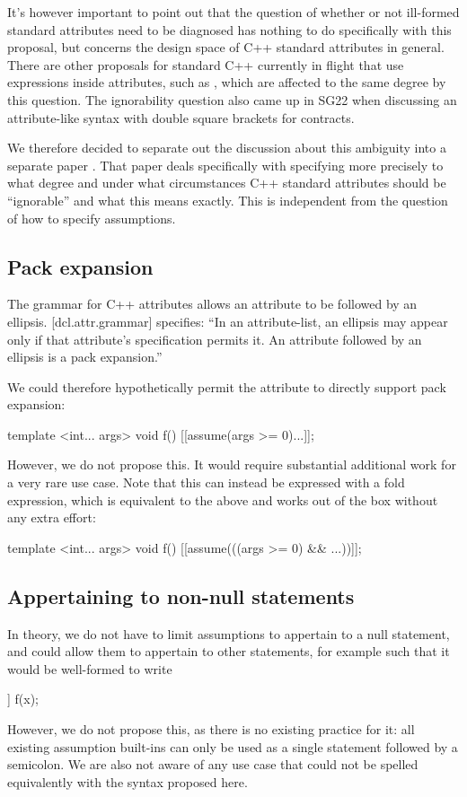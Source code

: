 It's however important to point out that the question of whether or not ill-formed standard attributes need to be diagnosed has nothing to do specifically with this proposal, but concerns the design space of C++ standard attributes in general. There are other proposals for standard C++ currently in flight that use expressions inside attributes, such as  \cite{P1144R5}, which are affected to the same degree by this question. The ignorability question also came up in SG22 when discussing an attribute-like syntax with double square brackets for contracts.

We therefore decided to separate out the discussion about this ambiguity into a separate paper \cite{P2552R0}. That paper deals specifically with specifying more precisely to what degree and under what circumstances C++ standard attributes should be ``ignorable'' and what this means exactly. This is independent from the question of how to specify assumptions.

\subsection{Pack expansion}

The grammar for C++ attributes allows an attribute to be followed by an ellipsis. [dcl.attr.grammar] specifies: ``In an attribute-list, an ellipsis may appear only if that attribute's specification permits it. An attribute followed by an ellipsis is a pack expansion.''

 We could therefore hypothetically permit the  attribute to directly support pack expansion:

\begin{codeblock}
template <int... args>
void f() {
    [[assume(args >= 0)...]];
}
\end{codeblock}

However, we do not propose this. It would require substantial additional work for a very rare use case. Note that this can instead be expressed with a fold expression, which is equivalent to the above and works out of the box without any extra effort:

\begin{codeblock}
template <int... args>
void f() {
    [[assume(((args >= 0) && ...))]];
}
\end{codeblock}

\subsection{Appertaining to non-null statements}
In theory, we do not have to limit assumptions to appertain to a null statement, and could allow them to appertain to other statements, for example such that it would be well-formed to write
\begin{codeblock}
[[assume(x >= 0)]] f(x);
\end{codeblock}
However, we do not propose this, as there is no existing practice for it: all existing assumption built-ins can only be used as a single statement followed by a semicolon. We are also not aware of any use case that could not be spelled equivalently with the syntax proposed here.

